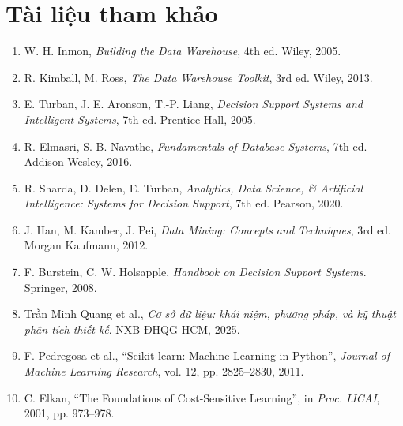 \documentclass[12pt]{article}
\begin{document}
\newpage
\section{Tài liệu tham khảo}
\begin{enumerate}
    \item W. H. Inmon, \textit{Building the Data Warehouse}, 4th ed. Wiley, 2005.
    \item R. Kimball, M. Ross, \textit{The Data Warehouse Toolkit}, 3rd ed. Wiley, 2013.
    \item E. Turban, J. E. Aronson, T.-P. Liang, \textit{Decision Support Systems and
    Intelligent Systems}, 7th ed. Prentice-Hall, 2005.
    \item R. Elmasri, S. B. Navathe, \textit{Fundamentals of Database Systems}, 7th ed.
    Addison-Wesley, 2016.
    \item R. Sharda, D. Delen, E. Turban, \textit{Analytics, Data Science, \& Artificial
    Intelligence: Systems for Decision Support}, 7th ed. Pearson, 2020.
    \item J. Han, M. Kamber, J. Pei, \textit{Data Mining: Concepts and Techniques}, 3rd ed.
    Morgan Kaufmann, 2012.
    \item F. Burstein, C. W. Holsapple, \textit{Handbook on Decision Support Systems}.
    Springer, 2008.
    \item Trần Minh Quang et al., \textit{Cơ sở dữ liệu: khái niệm, phương pháp, và kỹ thuật
    phân tích thiết kế}. NXB ĐHQG-HCM, 2025.
    \item F. Pedregosa et al., ``Scikit-learn: Machine Learning in Python'', \textit{Journal of
    Machine Learning Research}, vol. 12, pp. 2825--2830, 2011.
    \item C. Elkan, ``The Foundations of Cost-Sensitive Learning'', in \textit{Proc. IJCAI},
    2001, pp. 973--978.
\end{enumerate}
\end{document}
